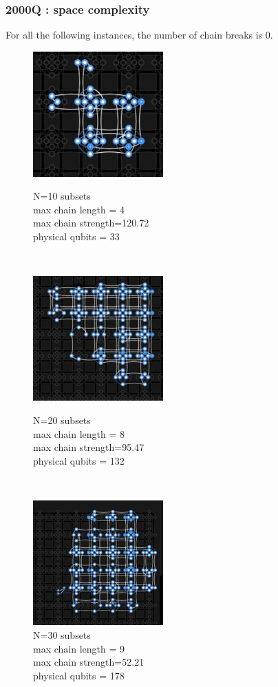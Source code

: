 \documentclass[oneside,a4paper]{article}
\begin{document}
\subsubsection{2000Q : space complexity}
For all the following instances, the number of chain breaks is 0.
\begin{figure}[htp]
\begin{minipage}[b]{4.5cm}
\includegraphics[width=5cm]{LaTeXTemplate/Images/2000QN10.png}
\caption{N=10 subsets\\max chain length = 4\\max chain strength=120.72\\physical qubits = 33}
\end{minipage}
\ \hspace{2mm} \hspace{2mm} \
\begin{minipage}[b]{4.5cm}
\includegraphics[width=5cm]{LaTeXTemplate/Images/2000QN20.png}
\caption{N=20 subsets\\max chain length = 8\\max chain strength=95.47\\physical qubits = 132}
\end{minipage}
\ \hspace{2mm} \hspace{2mm} \
\begin{minipage}[b]{4.5cm}
\centering
\includegraphics[width=5cm]{LaTeXTemplate/Images/2000QN30.png}
\caption{N=30 subsets\\max chain length = 9\\max chain strength=52.21\\physical qubits = 178}
\end{minipage}
\end{figure}
\end{document}
